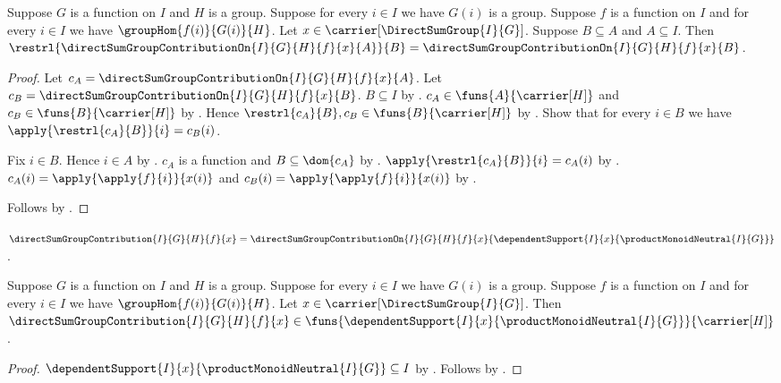 \begin{proposition}\label{direct_sum_group_contribution_on_restriction}
    Suppose $G$ is a function on $I$ and $H$ is a group.
    Suppose for every $i\in I$ we have $G(i)$ is a group.
    Suppose $f$ is a function on $I$ and
        for every $i\in I$ we have $\groupHom{f(i)}{G(i)}{H}$.
    Let $x\in\carrier[\DirectSumGroup{I}{G}]$.
    Suppose $B\subseteq A$ and $A\subseteq I$.
    Then
        $\restrl{\directSumGroupContributionOn{I}{G}{H}{f}{x}{A}}{B}
            =\directSumGroupContributionOn{I}{G}{H}{f}{x}{B}$.
\end{proposition}
\begin{proof}
    Let $c_A=\directSumGroupContributionOn{I}{G}{H}{f}{x}{A}$.
    Let $c_B=\directSumGroupContributionOn{I}{G}{H}{f}{x}{B}$.
    $B\subseteq I$ by .
    $c_A\in\funs{A}{\carrier[H]}$ and
        $c_B\in\funs{B}{\carrier[H]}$ by
        .
    Hence $\restrl{c_A}{B},c_B\in\funs{B}{\carrier[H]}$ by
        .
    Show that for every $i\in B$ we have
        $\apply{\restrl{c_A}{B}}{i}=c_B(i)$.
    \begin{subproof}
        Fix $i\in B$.
        Hence $i\in A$ by .
        $c_A$ is a function and $B\subseteq\dom{c_A}$ by
            .
        $\apply{\restrl{c_A}{B}}{i}=c_A(i)$ by
            .
        $c_A(i)=\apply{\apply{f}{i}}{x(i)}$ and
            $c_B(i)=\apply{\apply{f}{i}}{x(i)}$ by
            .
    \end{subproof}
    Follows by .
\end{proof}

\begin{definition}\label{direct_sum_group_contribution}
    $\directSumGroupContribution{I}{G}{H}{f}{x}
        =\directSumGroupContributionOn{I}{G}{H}{f}{x}{
            \dependentSupport{I}{x}{
                \productMonoidNeutral{I}{G}}}$.
\end{definition}

\begin{proposition}\label{direct_sum_group_contribution_type}
    Suppose $G$ is a function on $I$ and $H$ is a group.
    Suppose for every $i\in I$ we have $G(i)$ is a group.
    Suppose $f$ is a function on $I$ and
        for every $i\in I$ we have $\groupHom{f(i)}{G(i)}{H}$.
    Let $x\in\carrier[\DirectSumGroup{I}{G}]$.
    Then
        $\directSumGroupContribution{I}{G}{H}{f}{x}\in
            \funs{\dependentSupport{I}{x}{
                \productMonoidNeutral{I}{G}}}{\carrier[H]}$.
\end{proposition}
\begin{proof}
    $\dependentSupport{I}{x}{\productMonoidNeutral{I}{G}}
        \subseteq I$ by .
    Follows by
        .
\end{proof}

